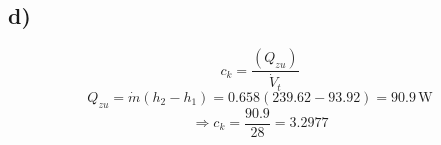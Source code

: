 

\subsection*{d)}
\[
c_k = \frac{(Q_{zu})}{\dot{V}_t}
\]
\[
Q_{zu} = \dot{m} (h_2 - h_1) = 0.658 (239.62 - 93.92) = 90.9 \, \text{W}
\]
\[
\Rightarrow c_k = \frac{90.9}{28} = 3.2977
\]